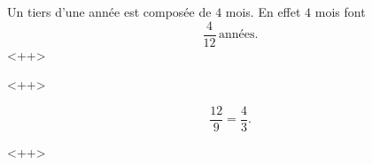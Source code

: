 \begin{example}
    Un tiers d'une année est composée de \( 4\) mois. En effet \( 4\) mois font
    \begin{equation}
        \frac{ 4 }{ 12 }\,\text{années}.
    \end{equation}
    <++>
\end{example}
<++>

\begin{example}
    \begin{equation}
        \frac{ 12 }{ 9 }=\frac{ 4 }{ 3 }.
    \end{equation}
\end{example}
<++>

